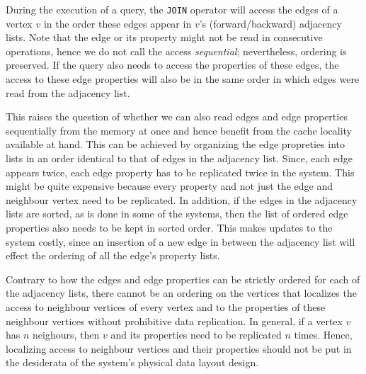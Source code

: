 \label{ssec:edges-ordered}
\begin{guideline}
During the execution of a query, the \texttt{JOIN} operator will access the edges of a vertex $v$ in the order these edges appear in $v$'s (forward/backward) adjacency lists. Note that the edge or its property might not be read in consecutive operations, hence we do not call the access \emph{sequential}; nevertheless, ordering is preserved. If the query also needs to access the properties of these edges, the access to these edge properties will also be in the same order in which edges were read from the adjacency list. 

This raises the question of whether we can also read edges and edge properties sequentially from the memory at once and hence benefit from the cache locality available at hand. This can be achieved by organizing the edge propreties into lists in an order identical to that of edges in the adjacency list. Since, each edge appears twice, each edge property has to be replicated twice in the system. This might be quite expensive because every property and not just the edge and neighbour vertex need to be replicated. In addition, if the edges in the adjacency lists are sorted, as is done in some of the systems, then the list of ordered edge properties also needs to be kept in sorted order. This makes updates to the system costly, since an insertion of a new edge in between the adjacency list will effect the ordering of all the edge's property lists.

\end{guideline}

\begin{guideline}
\label{gdln:vertices-unordered}
\vspace{-5pt}
Contrary to how the edges and edge properties can be strictly ordered for each of the adjacency lists, there cannot be an ordering on the vertices that localizes the access to neighbour vertices of every vertex and to the properties of these neighbour vertices without prohibitive data replication. In general, if a vertex $v$ has $n$ neighours, then $v$ and its properties need to be replicated $n$ times. Hence, localizing access to neighbour vertices and their properties should not be put in the desiderata of the system's physical data layout design.

\end{guideline}

